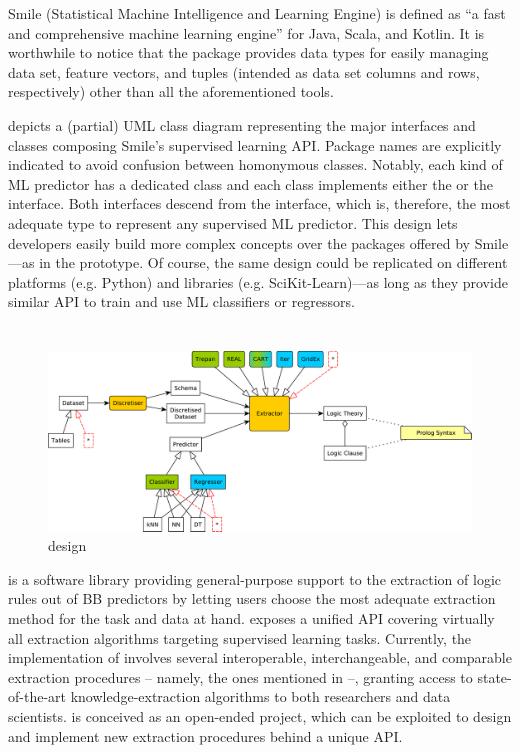 \documentclass[12pt,a4paper,openright,twoside]{book}
\begin{document}
Smile (Statistical Machine Intelligence and Learning Engine) is defined as ``a fast and comprehensive machine learning engine''\footnotemark{} for Java, Scala, and Kotlin.
%
%
It is worthwhile to notice that the package provides data types for easily managing data set, feature vectors, and tuples (intended as data set columns and rows, respectively) other than all the aforementioned tools.

 depicts a (partial) UML class diagram representing the major interfaces and classes composing Smile's supervised learning API.
%
Package names are explicitly indicated to avoid confusion between homonymous classes.
%
Notably, each kind of ML predictor has a dedicated class and each class implements either the  or the  interface.
%
Both interfaces descend from the  interface, which is, therefore, the most adequate type to represent any supervised ML predictor.
%
This design lets developers easily build more complex concepts over the packages offered by Smile---as in the \psyke{} prototype.
%
Of course, the same design could be replicated on different platforms (e.g. Python) and libraries (e.g. SciKit-Learn)---as long as they provide similar API to train and use ML classifiers or regressors.

\section{\psyke}\label{sec:psyke}

\begin{figure}
    \centering
    \includegraphics[width=\linewidth]{figures/Psyke.pdf}
    \caption{\psyke{} design}
    \label{fig:psyke-design}
\end{figure}

\psyke{} is a software library providing general-purpose support to the extraction of logic rules out of BB predictors by letting users choose the most adequate extraction method for the task and data at hand.
%
\psyke{} exposes a unified API covering virtually all extraction algorithms targeting supervised learning tasks.
%
Currently, the implementation of \psyke{} involves several interoperable, interchangeable, and comparable extraction procedures -- namely, the ones mentioned in  --,  granting access to state-of-the-art knowledge-extraction algorithms to both researchers and data scientists.
%
\psyke{} is conceived as an open-ended project, which can be exploited to design and implement new extraction procedures behind a unique API.
\end{document}
